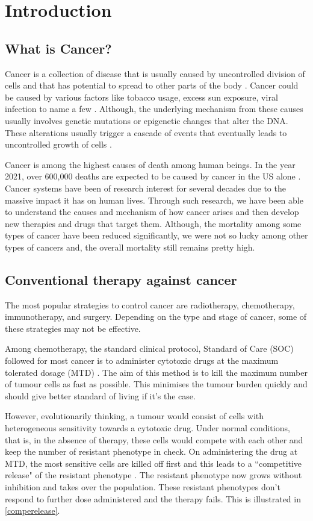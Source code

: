 \chapter{Introduction}

\section{What is Cancer?}
Cancer is a collection of disease that is usually caused by uncontrolled division of cells and that has potential to spread to other parts of the body \cite{cancergov}. Cancer could be caused by various factors like tobacco usage, excess sun exposure, viral infection to name a few \cite{Trichopoulos}. Although, the underlying mechanism from these causes usually involves genetic mutations or epigenetic changes that alter the DNA. These alterations usually trigger a cascade of events that eventually leads to uncontrolled growth of cells \cite{Moolgavkar,Gronbaek}.

Cancer is among the highest causes of death among human beings. In the year 2021, over 600,000 deaths are expected to be caused by cancer in the US alone \cite{cancer_stats}. Cancer systems have been of research interest for several decades due to the massive impact it has on human lives. Through such research, we have been able to understand the causes and mechanism of how cancer arises and then develop new therapies and drugs that target them. Although, the mortality among some types of cancer have been reduced significantly, we were not so lucky among other types of cancers and, the overall mortality still remains pretty high.

\section{Conventional therapy against cancer}
The most popular strategies to control cancer are radiotherapy, chemotherapy, immunotherapy, and surgery. Depending on the type and stage of cancer, some of these strategies may not be effective.

Among chemotherapy, the standard clinical protocol, Standard of Care (SOC) followed for most cancer is to administer cytotoxic drugs at the maximum tolerated dosage (MTD) \cite{Frei}. The aim of this method is to kill the maximum number of tumour cells as fast as possible. This minimises the tumour burden quickly and should give better standard of living if it's the case.

However, evolutionarily thinking, a tumour would consist of cells with  heterogeneous sensitivity towards a cytotoxic drug. Under normal conditions, that is, in the absence of therapy, these cells would compete with each other and keep the number of resistant phenotype in check. On administering the drug at MTD, the most sensitive cells are killed off first and this leads to a ``competitive release" of the resistant phenotype \cite{Scott}. The resistant phenotype now grows without inhibition and takes over the population. These resistant phenotypes don't respond to further dose administered and the therapy fails. This is illustrated in \autoref{comperelease}.

